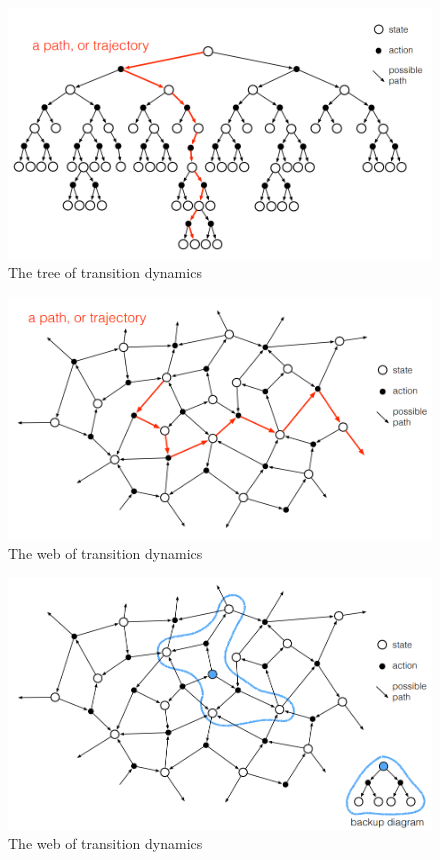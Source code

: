\begin{figure}[!htb]
\centering
\includegraphics[scale=0.7]{pix/tee-transition-dynamics.png}
\caption{The tree of transition dynamics}
\end{figure}


\begin{figure}[!htb]
\centering
\includegraphics[scale=0.7]{pix/web-transition-dynamics.png}
\caption{The web of transition dynamics}
\end{figure}


\begin{figure}[!htb]
\centering
\includegraphics[scale=0.7]{pix/web2-transition-dynamics.png}
\caption{The web of transition dynamics}
\end{figure}



